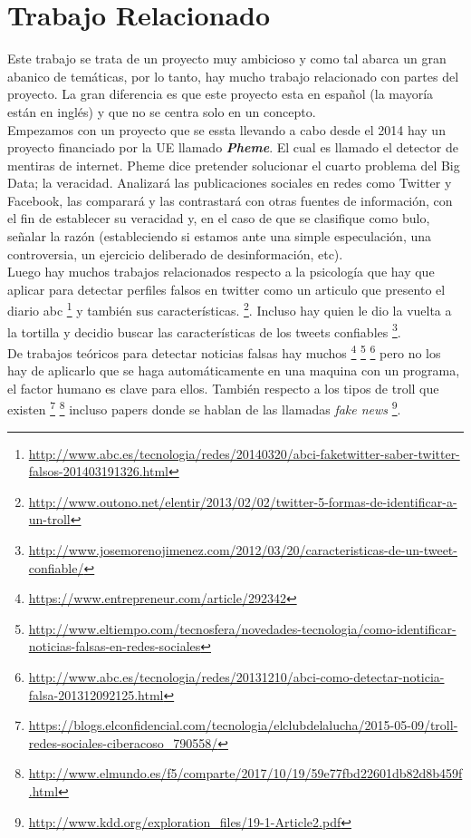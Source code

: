 \documentclass[../all.tex]{subfiles}
\begin{document}
\section{Trabajo Relacionado} %
    
    Este trabajo se trata de un proyecto muy ambicioso y como tal abarca un gran abanico de temáticas, por lo tanto, hay mucho trabajo relacionado con partes del proyecto. La gran diferencia es que este proyecto esta en español (la mayoría están en inglés) y que no se centra solo en un concepto.\\
    
    Empezamos con un proyecto que se essta llevando a cabo desde el 2014 hay un proyecto financiado por la UE llamado \textbf{\textit{Pheme}}. El cual es llamado el detector de mentiras de internet. Pheme dice pretender solucionar el cuarto problema del Big Data; la veracidad. Analizará las publicaciones sociales en redes como Twitter y Facebook, las comparará y las contrastará con otras fuentes de información, con el fin de establecer su veracidad y, en el caso de que se clasifique como bulo, señalar la razón (estableciendo si estamos ante una simple especulación, una controversia, un ejercicio deliberado de desinformación, etc).\\

    Luego hay muchos trabajos relacionados respecto a la psicología que hay que aplicar para detectar perfiles falsos en twitter como un articulo que presento el diario abc 
    \footnote{\tiny\url{http://www.abc.es/tecnologia/redes/20140320/abci-faketwitter-saber-twitter-falsos-201403191326.html}} y también sus características.
    \footnote{\tiny\url{http://www.outono.net/elentir/2013/02/02/twitter-5-formas-de-identificar-a-un-troll}}. Incluso hay quien le dio la vuelta a la tortilla y decidio buscar las características de los tweets confiables \footnote{\tiny\url{http://www.josemorenojimenez.com/2012/03/20/caracteristicas-de-un-tweet-confiable/}}.\\

    De trabajos teóricos para detectar noticias falsas hay muchos
    \footnote{\tiny\url{https://www.entrepreneur.com/article/292342}}
    \footnote{\tiny\url{http://www.eltiempo.com/tecnosfera/novedades-tecnologia/como-identificar-noticias-falsas-en-redes-sociales}}
    \footnote{\tiny\url{http://www.abc.es/tecnologia/redes/20131210/abci-como-detectar-noticia-falsa-201312092125.html}} pero no los hay de aplicarlo que se haga automáticamente en una maquina con un programa, el factor humano es clave para ellos. También respecto a los tipos de troll que existen \footnote{\tiny\url{https://blogs.elconfidencial.com/tecnologia/elclubdelalucha/2015-05-09/troll-redes-sociales-ciberacoso_790558/}}
    \footnote{\tiny\url{http://www.elmundo.es/f5/comparte/2017/10/19/59e77fbd22601db82d8b459f.html}} incluso papers donde se hablan de las llamadas \textit{fake news} \footnote{\tiny\url{http://www.kdd.org/exploration_files/19-1-Article2.pdf}}.\\
\end{document}
